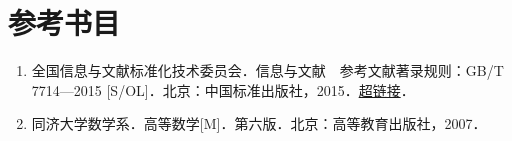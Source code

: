 

\appendix

\chapter{参考书目}

\begin{enumerate}
	\item 全国信息与文献标准化技术委员会．信息与文献　参考文献著录规则：GB/T 7714—2015 [S/OL]．北京：中国标准出版社，2015．\href{http://www.scal.edu.cn/dxtsgxb/201906120155}{超链接}．
	\item 同济大学数学系．高等数学[M]．第六版．北京：高等教育出版社，2007．
\end{enumerate}



